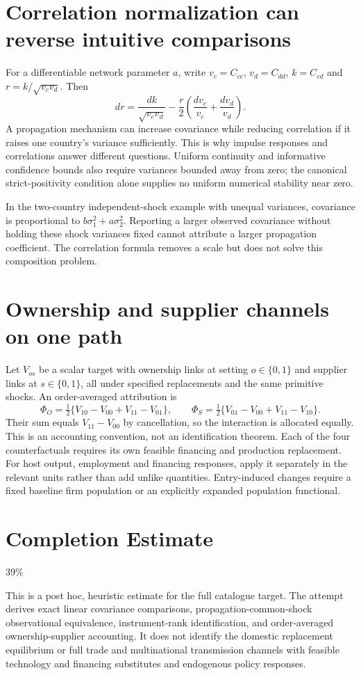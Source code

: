 \documentclass[11pt]{article}
\begin{document}
\section{Correlation normalization can reverse intuitive comparisons}
For a differentiable network parameter $a$, write $v_c=C_{cc}$, $v_d=C_{dd}$, $k=C_{cd}$ and $r=k/\sqrt{v_cv_d}$. Then
\[
 dr=\frac{dk}{\sqrt{v_cv_d}}
       -\frac r2\left(\frac{dv_c}{v_c}+\frac{dv_d}{v_d}\right).
\]
A propagation mechanism can increase covariance while reducing correlation if it raises one country's variance sufficiently. This is why impulse responses and correlations answer different questions. Uniform continuity and informative confidence bounds also require variances bounded away from zero; the canonical strict-positivity condition alone supplies no uniform numerical stability near zero.

In the two-country independent-shock example with unequal variances, covariance is proportional to $b\sigma_1^2+a\sigma_2^2$. Reporting a larger observed covariance without holding these shock variances fixed cannot attribute a larger propagation coefficient. The correlation formula removes a scale but does not solve this composition problem.

\section{Ownership and supplier channels on one path}
Let $V_{os}$ be a scalar target with ownership links at setting $o\in\{0,1\}$ and supplier links at $s\in\{0,1\}$, all under specified replacements and the same primitive shocks. An order-averaged attribution is
\[
 \Phi_O=\tfrac12\{V_{10}-V_{00}+V_{11}-V_{01}\},\qquad
 \Phi_S=\tfrac12\{V_{01}-V_{00}+V_{11}-V_{10}\}.
\]
Their sum equals $V_{11}-V_{00}$ by cancellation, so the interaction is allocated equally. This is an accounting convention, not an identification theorem. Each of the four counterfactuals requires its own feasible financing and production replacement. For host output, employment and financing responses, apply it separately in the relevant units rather than add unlike quantities. Entry-induced changes require a fixed baseline firm population or an explicitly expanded population functional.

\section{Completion Estimate}
39\%

This is a post hoc, heuristic estimate for the full catalogue target.
The attempt derives exact linear covariance comparisons, propagation-common-shock observational equivalence, instrument-rank identification, and order-averaged ownership-supplier accounting. It does not identify the domestic replacement equilibrium or full trade and multinational transmission channels with feasible technology and financing substitutes and endogenous policy responses.
\end{document}
